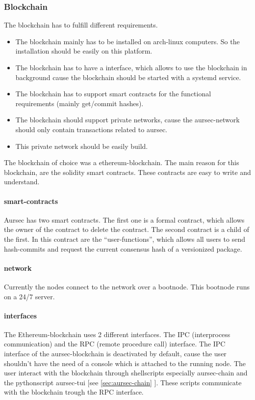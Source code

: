 \subsubsection{Blockchain} \label{sec:blockchain}
The blockchain has to fulfill different requirements.
\begin{itemize}
	\item The blockchain mainly has to be installed on arch-linux computers. So the installation should be easily on this platform.
	\item The blockchain has to have a interface, which allows to use the blockchain in background cause the blockchain should be started with a systemd service.
	\item The blockchain has to support smart contracts for the functional requirements (mainly get/commit hashes).
	\item The blockchain should support private networks, cause the aursec-network should only contain transactions related to aursec.
	\item This private network should be easily build.
\end{itemize}

The blockchain of choice was a ethereum-blockchain. The main reason for this blockchain, are the solidity smart contracts. These contracts are easy to write and understand. 

\paragraph*{smart-contracts}
Aursec has two smart contracts. The first one is a formal contract, which allows the owner of the contract to delete the contract. The second contract is a child of the first. In this contract are the ``user-functions'', which allows all users to send hash-commits and request the current consensus hash of a versionized package. 

\paragraph*{network}
Currently the nodes connect to the network over a bootnode. This bootnode runs on a 24/7 server.

\paragraph*{interfaces}
The Ethereum-blockchain uses 2 different interfaces. The IPC (interprocess communication) and the RPC (remote procedure call) interface. The IPC interface of the aursec-blockchain is deactivated by default, cause the user shouldn't have the need of a console which is attached to the running node. The user interact with the blockchain through shellscripts especially aursec-chain and the pythonscript aursec-tui [see \ref{sec:aursec-chain} ]. These scripts communicate with the blockchain trough the RPC interface. 